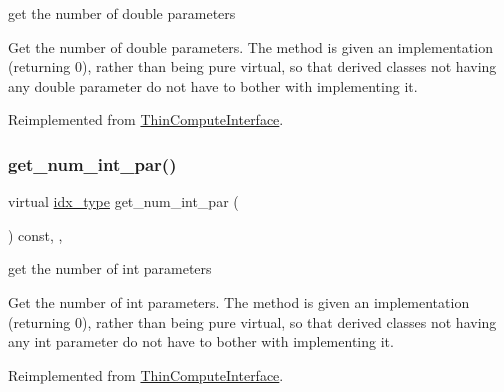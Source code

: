 get the number of double parameters 

Get the number of double parameters. The method is given an implementation (returning 0), rather than being pure virtual, so that derived classes not having any double parameter do not have to bother with implementing it. 

Reimplemented from \mbox{\hyperlink{class_s_m_spp__di__unipi__it_1_1_thin_compute_interface_a03d2492bc7caa7e7821fa1bc4f06a36e}{Thin\+Compute\+Interface}}.

\mbox{\label{class_s_m_spp__di__unipi__it_1_1_f_row_constraint_a3ad74d9506761eb2ca4c8a936fb7a1c5}} 
\subsubsection{\texorpdfstring{get\+\_\+num\+\_\+int\+\_\+par()}{get\_num\_int\_par()}}
{\footnotesize\ttfamily virtual \mbox{\hyperlink{class_s_m_spp__di__unipi__it_1_1_thin_compute_interface_aa3d710629ad8c434286726ad810c3b47}{idx\+\_\+type}} get\+\_\+num\+\_\+int\+\_\+par (\begin{DoxyParamCaption}\item[{void}]{ }\end{DoxyParamCaption}) const\hspace{0.3cm}{\ttfamily [inline]}, {\ttfamily [override]}, {\ttfamily [virtual]}}



get the number of int parameters 

Get the number of int parameters. The method is given an implementation (returning 0), rather than being pure virtual, so that derived classes not having any int parameter do not have to bother with implementing it. 

Reimplemented from \mbox{\hyperlink{class_s_m_spp__di__unipi__it_1_1_thin_compute_interface_a1e009f6b43f7966bf4b4740e0b4cff58}{Thin\+Compute\+Interface}}.

\mbox{\label{class_s_m_spp__di__unipi__it_1_1_f_row_constraint_a91f0341f09d59b3023fc95122a625125}} 
